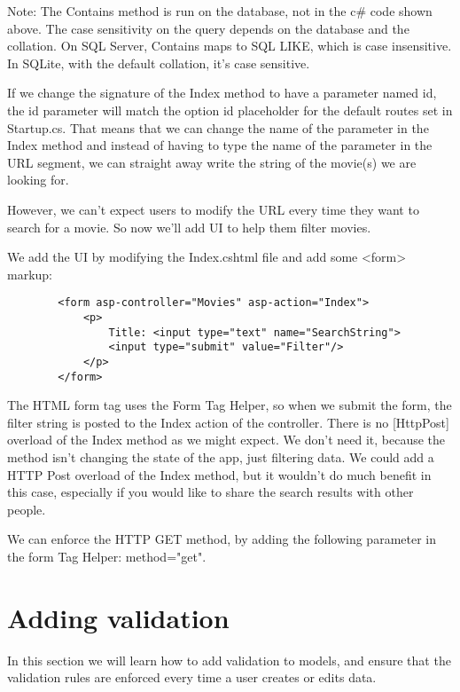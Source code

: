 \documentclass{report}
\begin{document}
    Note: The Contains method is run on the database, not in the c# code shown above.
    The case sensitivity on the query depends on the database and the collation. On SQL
    Server, Contains maps to SQL LIKE, which is case insensitive. In SQLite, with the
    default collation, it's case sensitive.

    If we change the signature of the Index method to have a parameter named id, the id
    parameter will match the option {id} placeholder for the default routes set in Startup.cs.
    That means that we can change the name of the parameter in the Index method
    and instead of having to type the name of the parameter in the URL segment, we can straight
    away write the string of the movie(s) we are looking for.

    However, we can't expect users to modify the URL every time they want to search for a movie.
    So now we'll add UI to help them filter movies.

    We add the UI by modifying the Index.cshtml file and add some <form> markup:
    \lstset{style=sharpc}
    \begin{lstlisting}
        <form asp-controller="Movies" asp-action="Index">
            <p>
                Title: <input type="text" name="SearchString">
                <input type="submit" value="Filter"/>
            </p>
        </form>
    \end{lstlisting}

    The HTML form tag uses the Form Tag Helper, so when we submit the form,
    the filter string is posted to the Index action of the controller.
    There is no [HttpPost] overload of the Index method as we might expect.
    We don't need it, because the method isn't changing the state of the app,
    just filtering data. We could add a HTTP Post overload of the Index method,
    but it wouldn't do much benefit in this case, especially if you would
    like to share the search results with other people.

    We can enforce the HTTP GET method, by adding the following parameter in
    the form Tag Helper: method="get".

    \chapter{Adding validation}
    In this section we will learn how to add validation to models, and ensure
    that the validation rules are enforced every time a user creates or edits
    data.
\end{document}

